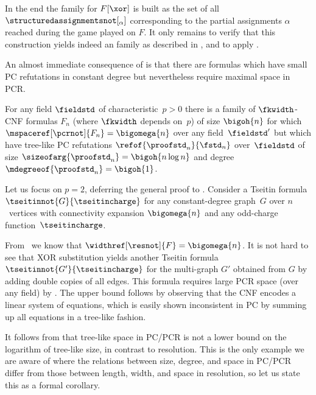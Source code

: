 \documentclass{toc}
\begin{document}
\begin{ourproof}[sketch]
  In the end the \kextendible family for $F[\xor]$ is built as the set
  of all $\structuredassignmentsnot[_\alpha]$ corresponding to the partial
  assignments $\alpha$ reached during the game played on $F$.
  It only remains to verify that this construction yields indeed an
  \kextendibleNok family as described in ,
  and to apply .
\end{ourproof}

\label{sec:overview-separation}

An almost immediate consequence of  is that
there are formulas which have small PC refutations in constant
degree but nevertheless require maximal space in PCR.

\begin{theorem}
  \label{thm:separation}
%
  For any field $\fieldstd$
  of characteristic~$p>0$
  there is a family of
  \mbox{$\fkwidth$-CNF} formulas
  $F_n$
  (where $\fkwidth$ depends on~$p$)
  of size $\bigoh{n}$
  for which
%
  $\mspaceref[\pcrnot]{F_{n}}=\bigomega{n}$
  over any field~$\fieldstd'$ %
  but  which have tree-like PC refutations
  $\refof{\proofstd_n}{\fstd_n}$ 
  over~$\fieldstd$
  of size
  $\sizeofarg{\proofstd_n}=\bigoh{n\log n}$
  and degree
  $\mdegreeof{\proofstd_n}=\bigoh{1}$.
\end{theorem}


\begin{ourproof}[sketch]
  Let us focus on 
  $p=2$, deferring the general proof to  
   .
  Consider a Tseitin formula $\tseitinnot{G}{\tseitincharge}$ 
  for any constant-degree graph~$G$ over $n$~vertices
  with connectivity expansion $\bigomega{n}$
  and any odd-charge function~$\tseitincharge$.
  
  From~\cite{BW01ShortProofs}
  we know that
  $\widthref[\resnot]{F}=\bigomega{n}$.
  It is not hard to see that XOR substitution yields
  another Tseitin formula
  $\tseitinnot{G'}{\tseitincharge}$ 
  for the multi-graph $G'$ obtained from $G$ 
  by adding double copies of all edges.
  This formula requires large PCR space (over any field)
  by .
  The upper bound follows by observing that the CNF encodes a linear
  system of equations, which is easily shown inconsistent in PC by summing
  up all equations in a tree-like fashion.
\end{ourproof}

It follows from  that
tree-like space in PC/PCR is not %
a lower bound on the logarithm of %
tree-like size, in contrast to resolution. 
This is the only example we are aware of where the relations between
size, degree, and space in PC/PCR differ from those between length,
width, and space in resolution, so let us state this as a formal
corollary.
\end{document}
